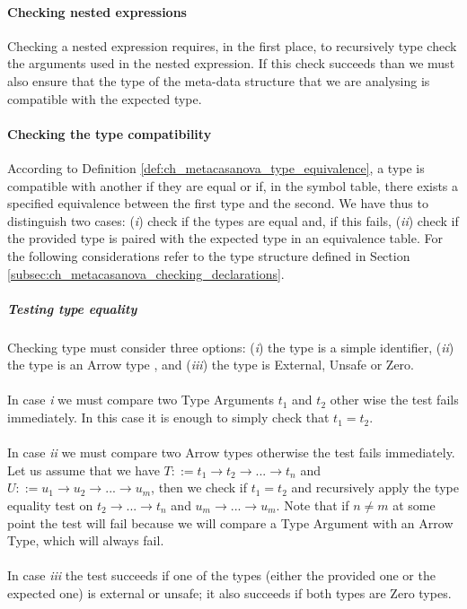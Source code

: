 \paragraph{Checking nested expressions}
Checking a nested expression requires, in the first place, to recursively type check the arguments used in the nested expression. If this check succeeds than we must also ensure that the type of the meta-data structure that we are analysing is compatible with the expected type.

\paragraph{Checking the type compatibility}
According to Definition \ref{def:ch_metacasanova_type_equivalence}, a type is compatible with another if they are equal or if, in the symbol table, there exists a specified equivalence between the first type and the second. We have thus to distinguish two cases: (\textit{i}) check if the types are equal and, if this fails, (\textit{ii}) check if the provided type is paired with the expected type in an equivalence table. For the following considerations refer to the type structure defined in Section \ref{subsec:ch_metacasanova_checking_declarations}.

\subparagraph{Testing type equality}
Checking type must consider three options: (\textit{i}) the type is a simple identifier, (\textit{ii}) the type is an Arrow type , and (\textit{iii}) the type is External, Unsafe or Zero.\\\\
In case \textit{i} we must compare two Type Arguments $t_1$ and $t_2$ other wise the test fails immediately. In this case it is enough to simply check that $t_1 = t_2$.\\\\
In case \textit{ii} we must compare two Arrow types otherwise the test fails immediately. Let us assume that we have $T ::= t_1 \rightarrow t_2 \rightarrow ... \rightarrow t_n$ and $U ::= u_1 \rightarrow u_2 \rightarrow ... \rightarrow u_m$, then we check if $t_1 = t_2$ and recursively apply the type equality test on $t_2 \rightarrow ... \rightarrow t_n$ and $u_m \rightarrow ... \rightarrow u_m$. Note that if $n \neq m$ at some point the test will fail because we will compare a Type Argument with an Arrow Type, which will always fail.\\\\
In case \textit{iii} the test succeeds if one of the types (either the provided one or the expected one) is external or unsafe; it also succeeds if both types are Zero types.


